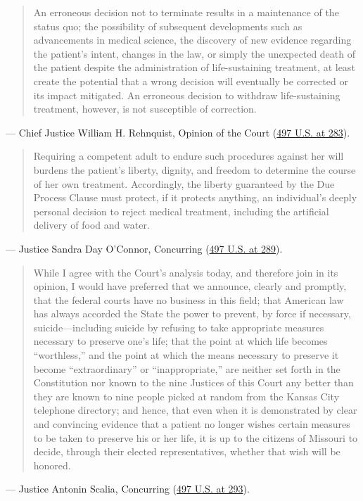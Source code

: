\documentclass[12pt]{article}
\begin{document}
\begin{quote}
An erroneous decision not to terminate results in a maintenance of the status quo; the possibility of subsequent developments such as advancements in medical science, the discovery of new evidence regarding the patient's intent, changes in the law, or simply the unexpected death of the patient despite the administration of life-sustaining treatment, at least create the potential that a wrong decision will eventually be corrected or its impact mitigated. An erroneous decision to withdraw life-sustaining treatment, however, is not susceptible of correction.
\end{quote}
\noindent --- Chief Justice William H. Rehnquist, Opinion of the Court (\href{https://supreme.justia.com/cases/federal/us/497/261/}{497 U.S. at 283}).

\begin{quote}
Requiring a competent adult to endure such procedures against her will burdens the patient's liberty, dignity, and freedom to determine the course of her own treatment. Accordingly, the liberty guaranteed by the Due Process Clause must protect, if it protects anything, an individual's deeply personal decision to reject medical treatment, including the artificial delivery of food and water.
\end{quote}
\noindent --- Justice Sandra Day O'Connor, Concurring (\href{https://supreme.justia.com/cases/federal/us/497/261/}{497 U.S. at 289}).

\begin{quote}
While I agree with the Court's analysis today, and therefore join in its opinion, I would have preferred that we announce, clearly and promptly, that the federal courts have no business in this field; that American law has always accorded the State the power to prevent, by force if necessary, suicide---including suicide by refusing to take appropriate measures necessary to preserve one's life; that the point at which life becomes ``worthless,'' and the point at which the means necessary to preserve it become ``extraordinary'' or ``inappropriate,'' are neither set forth in the Constitution nor known to the nine Justices of this Court any better than they are known to nine people picked at random from the Kansas City telephone directory; and hence, that even when it is demonstrated by clear and convincing evidence that a patient no longer wishes certain measures to be taken to preserve his or her life, it is up to the citizens of Missouri to decide, through their elected representatives, whether that wish will be honored.
\end{quote}
\noindent --- Justice Antonin Scalia, Concurring (\href{https://supreme.justia.com/cases/federal/us/497/261/}{497 U.S. at 293}).
\end{document}
